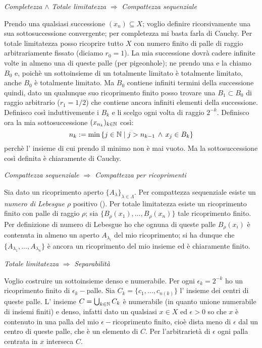 \centerline{{\it Completezza} $\wedge$ {\it Totale limitatezza} $\Rightarrow$ {\it Compattezza sequenziale}}
Prendo una qualsiasi successione $(x_n)\subseteq X$; voglio definire ricorsivamente una sua sottosuccessione convergente; per completezza mi basta farla di Cauchy. Per totale limitatezza posso ricoprire tutto $X$ con numero finito di palle di raggio arbitrariamente fissato (diciamo $r_0=1$). La mia successione dovrà cadere infinite volte in almeno una di queste palle (per pigeonhole); ne prendo una e la chiamo $B_0$ e, poichè un sottoinsieme di un totalmente limitato è totalmente limitato, anche $B_0$ è totalmente limitato. Ma $B_0$ contiene infiniti termini della successione quindi, dato un qualunque suo ricoprimento finito posso trovare una $B_1\subset B_0$ di raggio arbitrario ($r_1=1/2$) che contiene ancora infiniti elementi della successione. Definisco così induttivemente i $B_k$ e li scelgo ogni volta di raggio $2^{-k}$. Definisco ora la mia sottosuccessione $(x_{n_k})_{k\in\mathbb{N}}$ così:
$$ n_{k}:=\min\left\{j\in\mathbb{N}\mid j>n_{k-1}\, \wedge\, x_j\in B_k\right\} $$ 
perchè l' insieme di cui prendo il minimo non è mai vuoto. Ma la sottosuccessione così definita è chiaramente di Cauchy.\\

\centerline{{\it Compattezza sequenziale $\Rightarrow$ Compattezza per ricoprimenti}}
Sia dato un ricoprimento aperto $\{A_{\lambda}\}_{\lambda\in\Lambda}$. Per compattezza sequenziale esiste un {\it numero di Lebesgue $\rho$} positivo (). Per totale limitatezza esiste un ricoprimento finito con palle di raggio $\rho$; sia $\{B_{\rho}(x_1),\ldots,B_{\rho}(x_n)\}$ tale ricoprimento finito. Per definizione di numero di Lebesgue ho che ognuna di queste palle $B_{\rho}(x_i)$ è contenuta in almeno un aperto $A_{\lambda_i}$ del mio ricoprimento; si ha dunque che $\{A_{\lambda_1},\ldots,A_{\lambda_n}\}$ è ancora un ricoprimento del mio insieme ed è chiaramente finito.\\

\centerline{{\it Totale limitatezza} $\Rightarrow$ {\it Separabilità}}
Voglio costruire un sottoinsieme denso e numerabile. Per ogni $\epsilon_k=2^{-k}$ ho un ricoprimento finito di $\epsilon_k-$palle. Sia $C_k=\{c_1,\ldots,c_{n(k)}\}$ l' insieme dei centri di queste palle. L' insieme $C=\bigcup_{k\in\mathbb{N}}C_k$ è numerabile (in quanto unione numerabile di insiemi finiti) e denso, infatti dato un qualsiasi $x\in X$ ed $\epsilon>0$ so che $x$ è contenuto in una palla del mio $\epsilon-$ricoprimento finito, cioè dista meno di $\epsilon$ dal un centro di queste palle, che è un elemento di $C$. Per l'arbitrarietà di $\epsilon$ ogni palla centrata in $x$ interseca $C$.\\

